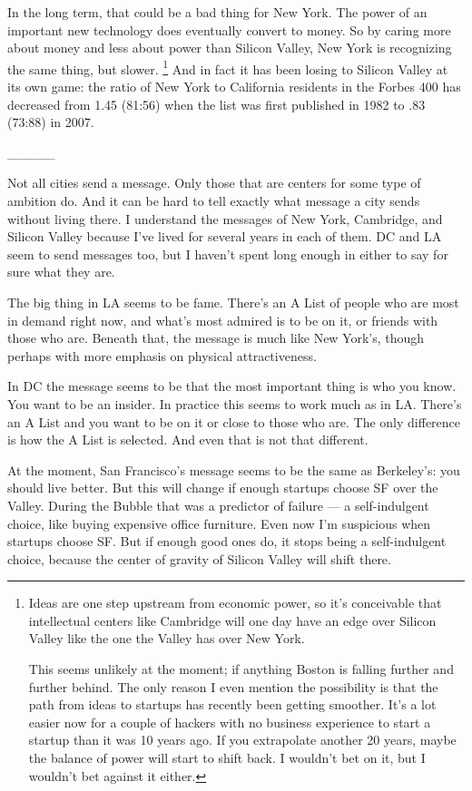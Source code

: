 \documentclass[12pt]{book}
\begin{document}
In the long term, that could be a bad thing for New York. The power of
an important new technology does eventually convert to money. So by
caring more about money and less about power than Silicon Valley, New
York is recognizing the same thing, but slower. \footnote{Ideas are one step upstream from economic power, so it's
conceivable that intellectual centers like Cambridge will one day have
an edge over Silicon Valley like the one the Valley has over New York.

This seems unlikely at the moment; if anything Boston is falling further
and further behind. The only reason I even mention the possibility is
that the path from ideas to startups has recently been getting smoother.
It's a lot easier now for a couple of hackers with no business
experience to start a startup than it was 10 years ago. If you
extrapolate another 20 years, maybe the balance of power will start to
shift back. I wouldn't bet on it, but I wouldn't bet against it either.}
And in fact it has been losing to Silicon Valley at its own game: the
ratio of New York to California residents in the Forbes 400 has
decreased from 1.45 (81:56) when the list was first published in 1982 to
.83 (73:88) in 2007.

\_\_\_\_\_

Not all cities send a message. Only those that are centers for some type
of ambition do. And it can be hard to tell exactly what message a city
sends without living there. I understand the messages of New York,
Cambridge, and Silicon Valley because I've lived for several years in
each of them. DC and LA seem to send messages too, but I haven't spent
long enough in either to say for sure what they are.

The big thing in LA seems to be fame. There's an A List of people who
are most in demand right now, and what's most admired is to be on it, or
friends with those who are. Beneath that, the message is much like New
York's, though perhaps with more emphasis on physical attractiveness.

In DC the message seems to be that the most important thing is who you
know. You want to be an insider. In practice this seems to work much as
in LA. There's an A List and you want to be on it or close to those who
are. The only difference is how the A List is selected. And even that is
not that different.

At the moment, San Francisco's message seems to be the same as
Berkeley's: you should live better. But this will change if enough
startups choose SF over the Valley. During the Bubble that was a
predictor of failure --- a self-indulgent choice, like buying expensive
office furniture. Even now I'm suspicious when startups choose SF. But
if enough good ones do, it stops being a self-indulgent choice, because
the center of gravity of Silicon Valley will shift there.
\end{document}
